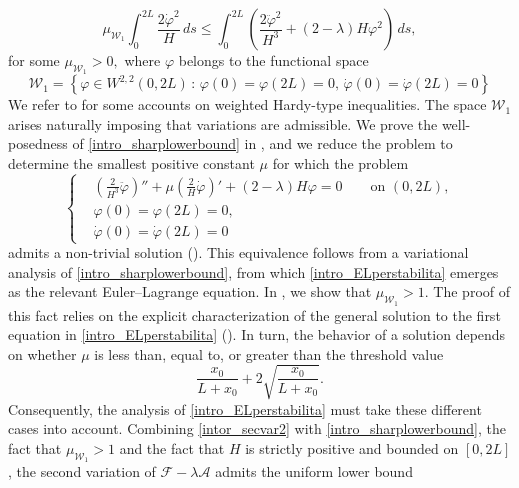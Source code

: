 \documentclass[11pt]{amsart}
\renewcommand{\leq}{\leqslant}
\newcommand{\A}{\mathcal A}
\newcommand{\F}{\mathcal F}
\theoremstyle{definition}
\theoremstyle{remark}
\numberwithin{equation}{section}
\begin{document}
	\begin{equation}\label{intro_sharplowerbound}
		\mu_{\mathcal W_1}\int_0^{2L}\frac{2\dot \varphi^2}{H}\,ds\leq \int_0^{2L}\left(\frac{2\ddot \varphi^2}{H^3}+(2-\lambda)H \varphi^2\right)\,ds,
	\end{equation}
	for some $\mu_{\mathcal W_1}>0,$ where $\varphi$ belongs to the functional space
	\begin{equation*}
		\mathcal W_1=\left\{\varphi\in W^{2,2}(0,2L)\,:\,\varphi(0)=\varphi(2L)=0,\,\dot\varphi(0)=\dot\varphi(2L)=0\right\}
	\end{equation*} 
	We refer to \cite{Beesack_1971,Flork_Lasarz_2001,Kwong_Zettl_2006,Leighton_1970,Talenti_1975} for some accounts on weighted Hardy-type inequalities. The space $\mathcal W_1$ arises naturally imposing that variations are admissible. We prove the well-posedness of \eqref{intro_sharplowerbound} in , and we reduce the problem to determine the smallest positive constant $\mu$ for which the problem 
	\begin{equation}\label{intro_ELperstabilita}
		\left\{
		\begin{aligned}
			&\left(\frac{2}{H^3} \ddot \varphi\right)''+\mu \left(\frac{2}{H} \dot \varphi\right)' + (2-\lambda)H\varphi = 0\qquad\text{on }(0,2L), \\
			&\varphi(0) = \varphi(2L) = 0, \\
			&\dot \varphi (0) = \dot \varphi(2L) = 0
		\end{aligned}
		\right.
	\end{equation}
	admits a non-trivial solution (). This equivalence follows from a variational analysis of \eqref{intro_sharplowerbound}, from which \eqref{intro_ELperstabilita} emerges as the relevant Euler–Lagrange equation. In , we show that $\mu_{\mathcal W_{1}}>1$. The proof of this fact relies on the explicit characterization of the general solution to the first equation in \eqref{intro_ELperstabilita} (). In turn, the behavior of a solution depends on whether $\mu$
	is less than, equal to, or greater than the threshold value
	\begin{equation*}
		\frac{x_0}{L+x_0}+2\sqrt{\frac{x_0}{L+x_0}}.
	\end{equation*}
	Consequently, the analysis of \eqref{intro_ELperstabilita} must take these different cases into account. Combining \eqref{intor_secvar2} with \eqref{intro_sharplowerbound}, the fact that $\mu_{\mathcal W_1}>1$ and the fact that $H$ is strictly positive and bounded on $[0,2L]$, the second variation of $\F-\lambda\A$ admits the uniform lower bound 
\end{document}
